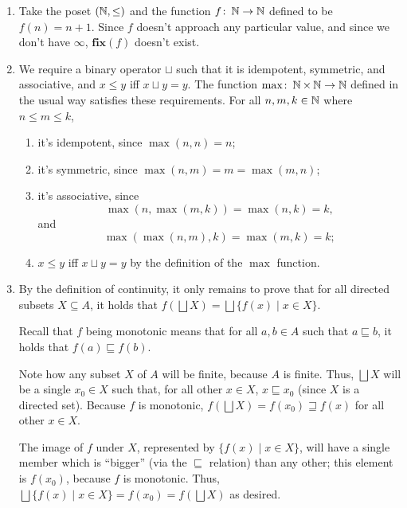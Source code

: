 \begin{enumerate}
    \item Take the poset $(\operatorname{\mathbb{N}}, \leq)$ and the function $f \colon \operatorname{\mathbb{N}} \to \operatorname{\mathbb{N}}$ defined to be $f(n) = n+1$.
    Since $f$ doesn't approach any particular value, and since we don't have $\infty$, $\mathbf{fix}(f)$ doesn't exist.
    
    \item We require a binary operator $\sqcup$ such that it is idempotent, symmetric, and associative, and $x \leq y$ iff $x \sqcup y = y$.
    The function $\max \colon \operatorname{\mathbb{N}} \times \operatorname{\mathbb{N}} \to \operatorname{\mathbb{N}}$ defined in the usual way satisfies these requirements.
    For all $n, m, k \in \operatorname{\mathbb{N}}$ where $n \leq m \leq k$,
    \begin{enumerate}[label=\roman*.]
        \item it's idempotent, since $\max(n, n) = n$;
        \item it's symmetric, since $\max(n, m) = m = \max(m, n)$;
        \item it's associative, since
        \begin{equation*}
            \max(n, \max(m, k)) = \max(n, k) = k,
        \end{equation*}
        and
        \begin{equation*}
            \max(\max(n, m), k) = \max(m, k) = k;
        \end{equation*}
        \item $x \leq y$ iff $x \sqcup y = y$ by the definition of the $\max$ function.
    \end{enumerate}

    \item By the definition of continuity, it only remains to prove that for all directed subsets $X \subseteq A$, it holds that $f(\bigsqcup X) = \bigsqcup\{f(x) \mid x \in X\}$.
    
    Recall that $f$ being monotonic means that for all $a, b \in A$ such that $a \sqsubseteq b$, it holds that $f(a) \sqsubseteq f(b)$.

    Note how any subset $X$ of $A$ will be finite, because $A$ is finite.
    Thus, $\bigsqcup X$ will be a single $x_0 \in X$ such that, for all other $x \in X$, $x \sqsubseteq x_0$ (since $X$ is a directed set).
    Because $f$ is monotonic, $f(\bigsqcup X) = f(x_0) \sqsupseteq f(x)$ for all other $x \in X$.

    The image of $f$ under $X$, represented by $\{f(x) \mid x \in X\}$, will have a single member which is ``bigger'' (via the $\sqsubseteq$ relation) than any other; this element is $f(x_0)$, because $f$ is monotonic.
    Thus, $\bigsqcup\{f(x) \mid x \in X\} = f(x_0) = f(\bigsqcup X)$ as desired.
    
\end{enumerate}
